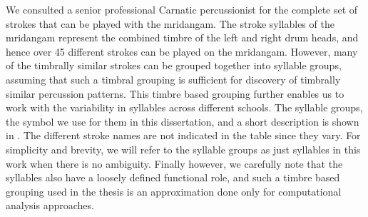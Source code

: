 We consulted a senior professional Carnatic percussionist for the complete set of strokes that can be played with the mridangam. The stroke syllables of the mridangam represent the combined timbre of the left and right drum heads, and hence over 45 different strokes can be played on the mridangam. However, many of the timbrally similar strokes can be grouped together into syllable groups, assuming that such a timbral grouping is sufficient for discovery of timbrally similar percussion patterns. This timbre based grouping further enables us to work with the variability in syllables across different schools. The syllable groups, the symbol we use for them in this dissertation, and a short description is shown in . The different stroke names are not indicated in the table since they vary. For simplicity and brevity, we will refer to the syllable groups as just syllables in this work when there is no ambiguity. Finally however, we carefully note that the syllables also have a loosely defined functional role, and such a timbre based grouping used in the thesis is an approximation done only for computational analysis approaches. 
% 

